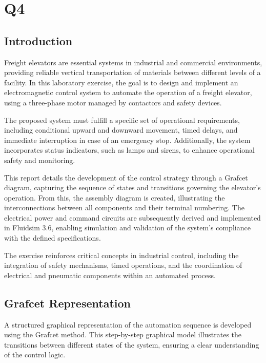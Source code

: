 \section{Q4} 

\subsection{Introduction} \label{sec:Introduction}

Freight elevators are essential systems in industrial and commercial environments, providing reliable 
vertical transportation of materials between different levels of a facility. In this laboratory exercise, 
the goal is to design and implement an electromagnetic control system to automate the operation of a freight 
elevator, using a three-phase motor managed by contactors and safety devices.

The proposed system must fulfill a specific set of operational requirements, including conditional 
upward and downward movement, timed delays, and immediate interruption in case of an emergency stop. 
Additionally, the system incorporates status indicators, such as lamps and sirens, to enhance operational 
safety and monitoring.

This report details the development of the control strategy through a Grafcet diagram, capturing the 
sequence of states and transitions governing the elevator’s operation. From this, the assembly diagram 
is created, illustrating the interconnections between all components and their terminal numbering. The 
electrical power and command circuits are subsequently derived and implemented in Fluidsim 3.6, enabling 
simulation and validation of the system’s compliance with the defined specifications.

The exercise reinforces critical concepts in industrial control, including the integration of safety 
mechanisms, timed operations, and the coordination of electrical and pneumatic components within an 
automated process.

\subsection{Grafcet Representation} \label{sec:Grafcet_Representation}

A structured graphical representation of the automation sequence is developed using the 
Grafcet method. This step-by-step graphical model illustrates the transitions between 
different states of the system, ensuring a clear understanding of the control logic.

